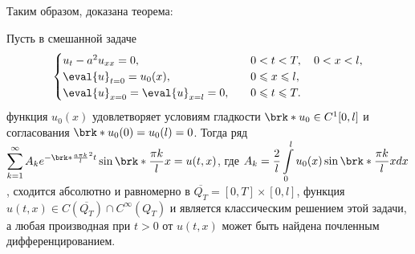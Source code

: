 Таким образом, доказана теорема:
\begin{theorem}
	Пусть в смешанной задаче
	\begin{equation*}
		\begin{cases}
			u_t - a^2u_{xx} = 0, \quad & 0 < t < T, \quad 0 < x < l, \\
			\eval{u}_{t=0} = u_0(x), \quad & 0 \leq x \leq l, \\
			\eval{u}_{x=0} = \eval{u}_{x=l} = 0, \quad & 0 \leq t \leq T.
		\end{cases}
	\end{equation*}
	функция $u_0(x)$ удовлетворяет условиям гладкости $\brk*{u_0 \in C^1[0,l]}$ и согласования $\brk*{u_0(0) = u_0(l) = 0}$. Тогда ряд $\displaystyle\sum\limits_{k=1}^{\infty} A_k e^{-\brk*{\frac{a\pi k}{l}}^2t} \sin\brk*{\dfrac{\pi k}{l}x} = u(t,x)$, где $A_k = \dfrac{2}{l} \displaystyle\int\limits_0^l u_0(x) \sin\brk*{\dfrac{\pi k}{l}x} dx$, сходится абсолютно и равномерно в $\overline{Q_T} = [0,T] \times [0,l]$, функция $u(t,x) \in C(\overline{Q_T}) \cap C^{\infty}(Q_T)$ и является классическим решением этой задачи, а любая производная при $t > 0$ от $u(t,x)$ может быть найдена почленным дифференцированием.
\end{theorem}
